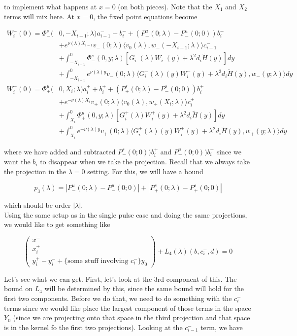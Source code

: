 \documentclass[12pt]{article}
\begin{document}
\begin{enumerate}
to implement what happens at $x = 0$ (on both pieces). Note that the $X_1$ and $X_2$ terms will mix here. At $x = 0$, the fixed point equations become

\begin{align*}
W_i^-(0) = \Phi^s_-(&0, -X_{i-1}; \lambda)a_{i-1}^- + b_i^- + (P^u_-(0; \lambda) - P^u_-(0; 0))b_i^- \\
&+ e^{\nu(\lambda)X_{i-1}} v_-(0; \lambda) \langle v_0(\lambda), w_-(-X_{i-1}; \lambda) \rangle c_{i-1}^- \\
&+ \int_{-X_{i-1}}^0 \Phi^s_-(0, y; \lambda) [ G_i^-(\lambda)W_i^-(y) + \lambda^2 d_i \tilde{H}(y) ] dy \\
&+ \int_{-X_{i-1}}^0
e^{\nu(\lambda)y} v_-(0; \lambda) \langle G_i^-(\lambda)(y)W_i^-(y) + \lambda^2 d_i \tilde{H}(y), w_-(y; \lambda) \rangle dy \\
W_i^+(0) = \Phi^u_+(&0, X_i; \lambda)a_i^+ + b_i^+ + (P^s_+(0; \lambda) - P^s_-(0; 0))b_i^+ \\
&+ e^{-\nu(\lambda) X_i} v_+(0; \lambda) \langle v_0(\lambda), w_+(X_i; \lambda) \rangle c_i^+ \\
&+ \int_{X_i}^0 \Phi^u_+(0, y; \lambda) [ G_i^+(\lambda)W_i^+(y) + \lambda^2 d_i \tilde{H}(y) ] dy \\
&+ \int_{X_i}^0 e^{-\nu(\lambda)y} v_+(0; \lambda) \langle G_i^+(\lambda)(y)W_i^+(y) + \lambda^2 d_i \tilde{H}(y), w_+(y; \lambda) \rangle dy
\end{align*}

where we have added and subtracted $P^s_-(0; 0))b_i^+$ and $P^u_-(0; 0))b_i^-$ since we want the $b_i$ to disappear when we take the projection. Recall that we always take the projection in the $\lambda = 0$ setting. For this, we will have a bound

\[
p_3(\lambda) = |P^u_-(0;\lambda) - P^u_-(0; 0)| + |P^s_+(0;\lambda) - P^s_+(0;0)|
\]

which should be order $|\lambda|$.\\

Using the same setup as in the single pulse case and doing the same projections, we would like to get something like

\[
\begin{pmatrix}x^- \\ x_i^+ \\ y_i^+ - y_i^- + \text{\{some stuff involving $c_i^-$\} $y_0$} \end{pmatrix}+ L_4(\lambda)(b, c_i^-,d) = 0
\]

Let's see what we can get. First, let's look at the 3rd component of this. The bound on $L_4$ will be determined by this, since the same bound will hold for the first two components. Before we do that, we need to do something with the $c_i^-$ terms since we would like place the largest component of those terms in the space $Y_0$ (since we are projecting onto that space in the third projection and that space is in the kernel fo the first two projections). Looking at the $c_{i-1}^-$ term, we have


\end{enumerate}
\end{document}
